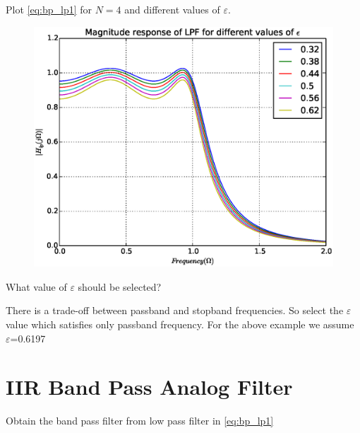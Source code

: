 \documentclass[journal,12pt,twocolumn]{IEEEtran}
\begin{document}
\solution

\begin{problem}
Plot \eqref{eq:bp_lp1} for $N=4$ and different values of $\varepsilon$.
\end{problem}
\solution

\begin{figure}
\centering
\includegraphics[width=\columnwidth]{./figs/lowpass.eps}
\caption{}
\label{fig:anaog_lpf}
\end{figure}
\begin{problem}
What value of $\varepsilon$ should be selected?
\end{problem}
\solution
There is a trade-off between passband and stopband frequencies. So select the $\varepsilon$ value which satisfies only passband frequency.
For the above example we assume $\varepsilon$=0.6197
\section{IIR Band Pass Analog Filter}
\begin{problem}
Obtain the band pass filter from low pass filter in \eqref{eq:bp_lp1}
\end{problem}
\solution
\end{document}
